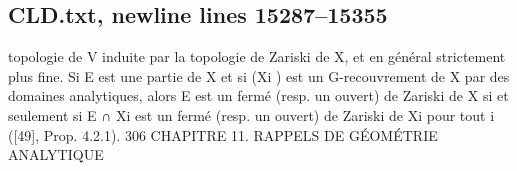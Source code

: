 \documentclass[
  10pt,
]{article}
\newenvironment{Shaded}{}{}
\newcommand{\NormalTok}[1]{#1}
\begin{document}
\subsection{CLD.txt, newline lines
15287--15355}\label{cld.txt-newline-lines-1528715355}

\begin{Shaded}
\begin{Highlighting}[]
\NormalTok{topologie de V induite par la topologie de Zariski de X, et en général strictement plus}
\NormalTok{fine.}
\NormalTok{   Si E est une partie de X et si (Xi ) est un G{-}recouvrement de X par des domaines}
\NormalTok{analytiques, alors E est un fermé (resp. un ouvert) de Zariski de X si et seulement si}
\NormalTok{E ∩ Xi est un fermé (resp. un ouvert) de Zariski de Xi pour tout i ([49], Prop. 4.2.1).}
\NormalTok{306                  CHAPITRE 11. RAPPELS DE GÉOMÉTRIE ANALYTIQUE}


\end{Highlighting}
\end{Shaded}
\end{document}
